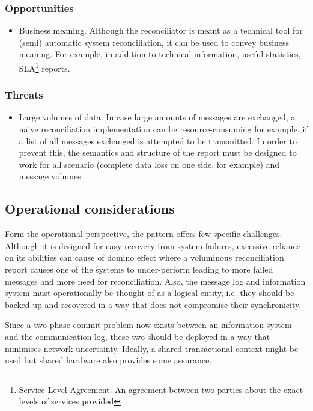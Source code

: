 \documentclass[10pt,a4paper]{article}
\begin{document}
\subsubsection{Opportunities}	
	 	\begin{itemize}
			\item Business meaning. Although the reconciliator is meant as a technical tool for (semi) automatic system reconciliation, it can be used to convey business meaning. For example, in addition to technical information, useful statistics, SLA\footnote{Service Level Agreement. An agreement between two parties about the exact levels of services provided} reports. 
		\end{itemize}
\subsubsection{Threats}	
	 	\begin{itemize}
			\item Large volumes of data. In case large amounts of messages are exchanged, a naive reconciliation implementation can be resource-consuming for example, if a list of all messages exchanged is attempted to be transmitted. In order to prevent this, the semantics and structure of the report must be designed to work for all scenario (complete data loss on one side, for example) and message volumes
		\end{itemize}

\subsection{Operational considerations}
Form the operational perspective, the pattern offers few specific challenges. Although it is designed for easy recovery from system failures, excessive reliance on its abilities can cause of domino effect where a voluminous reconciliation report causes one of the systems to under-perform leading to more failed messages and more need for reconciliation. Also, the message log and information system must operationally be thought of as a logical entity, i.e. they should be backed up and recovered in a way that does not compromise their synchronicity. 

Since a two-phase commit problem now exists between an information system and the communication log, these two should be deployed in a way that minimises network uncertainty. Ideally, a shared transactional context might be used but shared hardware also provides some assurance. 
\end{document}
